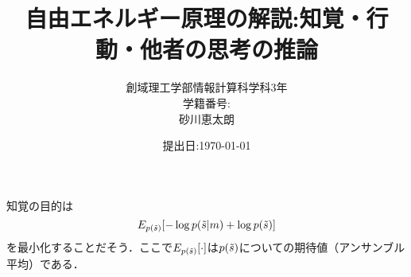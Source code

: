 \documentclass[a4paper, titlepage]{jsarticle}
\title{\Huge 自由エネルギー原理の解説\;:\;知覚・行動・他者の思考の推論}
\author{\Large 創域理工学部\quad 情報計算科学科\quad 3年\\\Large 学籍番号\;:\;6322045\\\Large 砂川恵太朗}
\date{提出日\;:\;\today}
\begin{document}
\maketitle

知覚の目的は
\begin{equation*}
    E_{p\qty(\tilde{s})}\qty[-\log p\qty(\tilde{s}|m)+\log p\qty(\tilde{s})]
\end{equation*}
を最小化することだそう．ここで\;$E_{p\qty(\tilde{s})}\qty[\cdot]$\;は$p\qty(\tilde{s})$についての期待値（アンサンブル平均）である．
\end{document}
